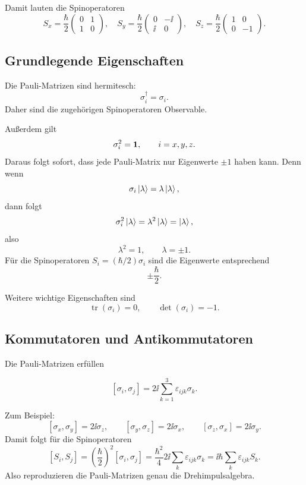 Damit lauten die Spinoperatoren
\[
    S_x=\frac{\hbar}{2}
    \begin{pmatrix}
        0&1\\1&0
    \end{pmatrix},
    \quad
    S_y=\frac{\hbar}{2}
    \begin{pmatrix}
        0&-\ii\\\ii&0
    \end{pmatrix},
    \quad
    S_z=\frac{\hbar}{2}
    \begin{pmatrix}
        1&0\\0&-1
    \end{pmatrix}.
\]

\subsection{Grundlegende Eigenschaften}

Die Pauli-Matrizen sind hermitesch:
\[
    \sigma_i^\dagger=\sigma_i.
\]
Daher sind die zugehörigen Spinoperatoren Observable.

Außerdem gilt
\[
    \sigma_i^2=\mathbf{1},
    \qquad i=x,y,z.
\]
Daraus folgt sofort, dass jede Pauli-Matrix nur Eigenwerte \(\pm1\) haben kann. Denn wenn
\[
    \sigma_i\left|\lambda\right\rangle=\lambda\left|\lambda\right\rangle,
\]
dann folgt
\[
    \sigma_i^2\left|\lambda\right\rangle=\lambda^2\left|\lambda\right\rangle=\left|\lambda\right\rangle,
\]
also
\[
    \lambda^2=1,
    \qquad \lambda=\pm1.
\]
Für die Spinoperatoren \(S_i=(\hbar/2)\sigma_i\) sind die Eigenwerte entsprechend
\[
    \pm\frac{\hbar}{2}.
\]

Weitere wichtige Eigenschaften sind
\[
    \operatorname{tr}(\sigma_i)=0,
    \qquad
    \det(\sigma_i)=-1.
\]

\subsection{Kommutatoren und Antikommutatoren}

Die Pauli-Matrizen erfüllen
\begin{formulabox}
\[
    [\sigma_i,\sigma_j]
    =2\ii\sum_{k=1}^3\varepsilon_{ijk}\sigma_k.
\]
\end{formulabox}

Zum Beispiel:
\[
    [\sigma_x,\sigma_y]=2\ii\sigma_z,
    \qquad
    [\sigma_y,\sigma_z]=2\ii\sigma_x,
    \qquad
    [\sigma_z,\sigma_x]=2\ii\sigma_y.
\]
Damit folgt für die Spinoperatoren
\[
    [S_i,S_j]
    =\left(\frac{\hbar}{2}\right)^2[\sigma_i,\sigma_j]
    =\frac{\hbar^2}{4}2\ii\sum_k\varepsilon_{ijk}\sigma_k
    =\ii\hbar\sum_k\varepsilon_{ijk}S_k.
\]
Also reproduzieren die Pauli-Matrizen genau die Drehimpulsalgebra.


